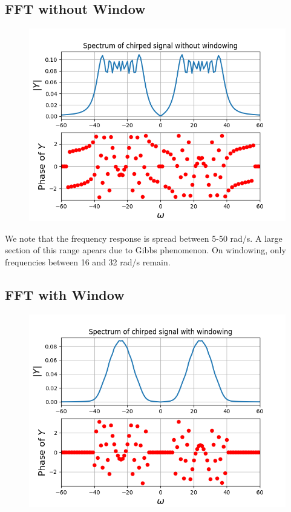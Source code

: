 \documentclass{article}
\begin{document}
\subsection{FFT without Window}
\begin{figure}[h!]
\centering
\includegraphics[scale=0.5]{Figure_12.png}
\label{fig:universe}
\end{figure}
We note that the frequency response is spread between 5-50 rad/s. A large section of this range apears due to Gibbs phenomenon. On windowing, only frequencies between 16 and 32 rad/s remain.

\subsection{FFT with Window}
\begin{figure}[h!]
\centering
\includegraphics[scale=0.5]{Figure_13.png}
\label{fig:universe}
\end{figure}
\end{document}
